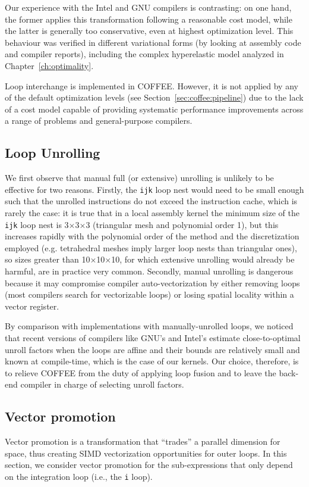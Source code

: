 Our experience with the Intel and GNU compilers is contrasting: on one hand, the former applies this transformation following a reasonable cost model, while the latter is generally too conservative, even at highest optimization level. This behaviour was verified in different variational forms (by looking at assembly code and compiler reports), including the complex hyperelastic model analyzed in Chapter~\ref{ch:optimality}. 

Loop interchange is implemented in COFFEE. However, it is not applied by any of the default optimization levels (see Section~\ref{sec:coffee:pipeline}) due to the lack of a cost model capable of providing systematic performance improvements across a range of problems and general-purpose compilers.  

\subsection{Loop Unrolling}
We first observe that manual full (or extensive) unrolling is unlikely to be effective for two reasons. Firstly, the \texttt{ijk} loop nest would need to be small enough such that the unrolled instructions do not exceed the instruction cache, which is rarely the case: it is true that in a local assembly kernel the minimum size of the \texttt{ijk} loop nest is 3$\times$3$\times$3 (triangular mesh and polynomial order 1), but this increases rapidly with the polynomial order of the method and the discretization employed (e.g. tetrahedral meshes imply larger loop nests than triangular ones), so sizes greater than 10$\times$10$\times$10, for which extensive unrolling would already be harmful, are in practice very common. Secondly, manual unrolling is dangerous because it may compromise compiler auto-vectorization by either removing loops (most compilers search for vectorizable loops) or losing spatial locality within a vector register.

By comparison with implementations with manually-unrolled loops, we noticed that recent versions of compilers like GNU's and Intel's estimate close-to-optimal unroll factors when the loops are affine and their bounds are relatively small and known at compile-time, which is the case of our kernels. Our choice, therefore, is to relieve COFFEE from the duty of applying loop fusion and to leave the back-end compiler in charge of selecting unroll factors.

\subsection{Vector promotion}
\label{sec:coffee-precompute}
Vector promotion is a transformation that ``trades'' a parallel dimension for space, thus creating SIMD vectorization opportunities for outer loops. In this section, we consider vector promotion for the sub-expressions that only depend on the integration loop (i.e., the {\tt i} loop). 

